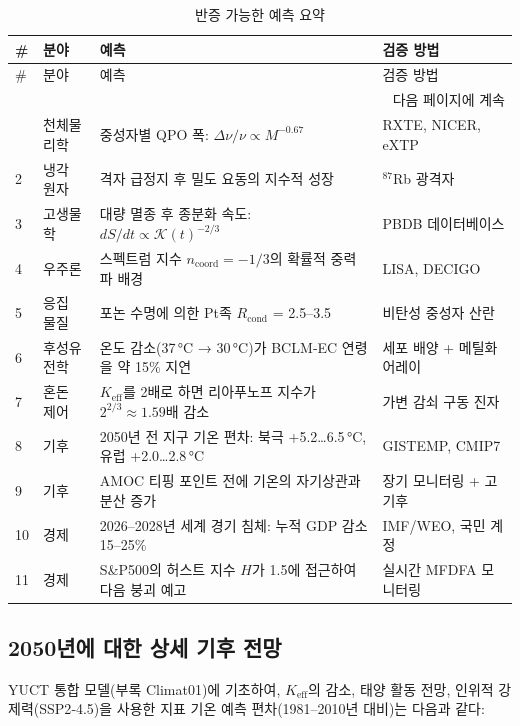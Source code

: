 \documentclass[12pt,a4paper]{article}
\newcommand{\Keff}{K_{\mathrm{eff}}}
\newcommand{\REL}{\mathcal{K}}
\begin{document}
	\begin{longtable}{|p{2cm}|p{3cm}|p{4.5cm}|p{4cm}|}
		\caption{반증 가능한 예측 요약}\label{tab:predictions}\\
		\hline
		\textbf{\#} & \textbf{분야} & \textbf{예측} & \textbf{검증 방법} \\
		\hline
		\endfirsthead
		\hline
		\# & 분야 & 예측 & 검증 방법 \\
		\hline
		\endhead
		\hline
		\multicolumn{4}{r}{다음 페이지에 계속} \\
		\endfoot
		\hline
		\endlastfoot
		1 & 천체물리학 & 중성자별 QPO 폭: \(\Delta\nu/\nu \propto M^{-0.67}\) & RXTE, NICER, eXTP \\
		2 & 냉각 원자 & 격자 급정지 후 밀도 요동의 지수적 성장 & \({}^{87}\)Rb 광격자 \\
		3 & 고생물학 & 대량 멸종 후 종분화 속도: \(dS/dt \propto \REL(t)^{-2/3}\) & PBDB 데이터베이스 \\
		4 & 우주론 & 스펙트럼 지수 \(n_{\mathrm{coord}} = -1/3\)의 확률적 중력파 배경 & LISA, DECIGO \\
		5 & 응집 물질 & 포논 수명에 의한 Pt족 \(R_{\text{cond}}\) = 2.5–3.5 & 비탄성 중성자 산란 \\
		6 & 후성유전학 & 온도 감소(37 °C → 30 °C)가 BCLM‑EC 연령을 약 15\% 지연 & 세포 배양 + 메틸화 어레이 \\
		7 & 혼돈 제어 & \(\Keff\)를 2배로 하면 리아푸노프 지수가 \(2^{2/3} \approx 1.59\)배 감소 & 가변 감쇠 구동 진자 \\
		8 & 기후 & 2050년 전 지구 기온 편차: 북극 +5.2…6.5 °C, 유럽 +2.0…2.8 °C & GISTEMP, CMIP7 \\
		9 & 기후 & AMOC 티핑 포인트 전에 기온의 자기상관과 분산 증가 & 장기 모니터링 + 고기후 \\
		10 & 경제 & 2026–2028년 세계 경기 침체: 누적 GDP 감소 15–25\% & IMF/WEO, 국민 계정 \\
		11 & 경제 & S\&P500의 허스트 지수 \(H\)가 1.5에 접근하여 다음 붕괴 예고 & 실시간 MFDFA 모니터링 \\
	\end{longtable}
	
	\subsection{2050년에 대한 상세 기후 전망}
	
	YUCT 통합 모델(부록 Climat01)에 기초하여, \(\Keff\)의 감소, 태양 활동 전망, 인위적 강제력(SSP2‑4.5)을 사용한 지표 기온 예측 편차(1981–2010년 대비)는 다음과 같다:
	
\end{document}
